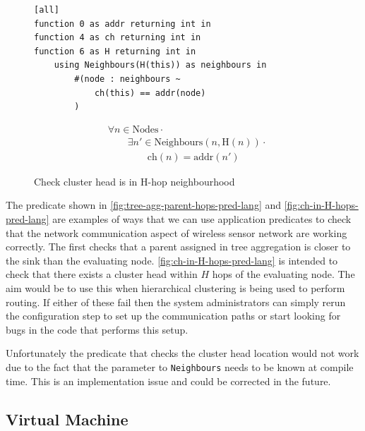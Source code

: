 \begin{figure}[H]
\begin{minipage}{.5\linewidth}
\begin{lstlisting}[language=Hoppy]
[all]
function 0 as addr returning int in
function 4 as ch returning int in
function 6 as H returning int in
    using Neighbours(H(this)) as neighbours in
        #(node : neighbours ~
            ch(this) == addr(node)
        )
\end{lstlisting}
\end{minipage}%
\begin{minipage}{.5\linewidth}
\begin{align*}
&				\forall n \in \text{Nodes} \cdot \\
& \hspace{2em}		\exists n' \in \text{Neighbours}(n, \text{H}(n)) \cdot \\
& \hspace{4em}			\text{ch}(n) = \text{addr}(n')
\end{align*}
\end{minipage}
\caption{Check cluster head is in H-hop neighbourhood}
\label{fig:ch-in-H-hops-pred-lang}
\end{figure}

The predicate shown in \autoref{fig:tree-agg-parent-hops-pred-lang} and \autoref{fig:ch-in-H-hops-pred-lang} are examples of ways that we can use application predicates to check that the network communication aspect of wireless sensor network are working correctly. The first checks that a parent assigned in tree aggregation is closer to the sink than the evaluating node. \autoref{fig:ch-in-H-hops-pred-lang} is intended to check that there exists a cluster head within $H$ hops of the evaluating node. The aim would be to use this when hierarchical clustering is being used to perform routing. If either of these fail then the system administrators can simply rerun the configuration step to set up the communication paths or start looking for bugs in the code that performs this setup.

Unfortunately the predicate that checks the cluster head location would not work due to the fact that the parameter to \verb|Neighbours| needs to be known at compile time. This is an implementation issue and could be corrected in the future.


\subsection{Virtual Machine}

